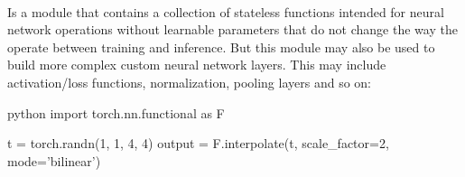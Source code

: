 \begin{defnbox}\nospacing
    \begin{defn}\label{defn:torch_functional}\leavevmode\\
        Is a module that contains a collection of stateless functions intended for neural network operations without learnable parameters that do not change
        the way the operate between training and inference.
        But this module may also be used to build more complex custom neural network layers.
        This may include activation/loss functions, normalization, pooling layers and so on:
        \begin{mintlinebox}{python}
            import torch.nn.functional as F

            t = torch.randn(1, 1, 4, 4)
            output = F.interpolate(t, scale_factor=2, mode='bilinear')
        \end{mintlinebox}
    \end{defn}
\end{defnbox}

